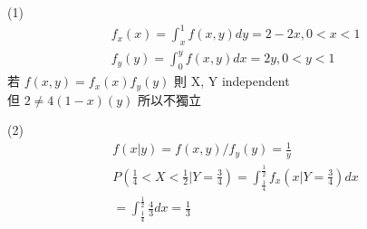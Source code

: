 \documentclass{article}
\begin{document}
\fontsize{15pt}{20pt}\selectfont

\begin{CJK}{UTF8}{bsmi} %
\noindent

(1)\begin{align*}
f_x(x)= \int_{x}^{1} f(x, y) dy = 2-2x, 0<x<1 \\
f_y(y)= \int_{0}^{y} f(x, y) dx = 2y, 0<y<1 
\end{align*}
若 $f(x,y) = f_x(x)f_y(y)$ 則 X, Y independent\\
但 $2\neq 4(1-x)(y)$ 所以不獨立


(2)
\begin{align*}
f(x|y) = f(x, y) / f_y(y) = \frac{1}{y}\\
P(\frac{1}{4} < X < \frac{1}{2} | Y = \frac{3}{4}) = \int_{\frac{1}{4}}^{\frac{1}{2}} f_x(x | Y = \frac{3}{4})dx \\
= \int_{\frac{1}{4}}^{\frac{1}{2}} \frac{4}{3} dx
= \frac{1}{3}
\end{align*}



\end{CJK} %
\end{document}
